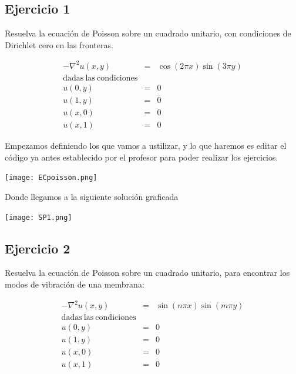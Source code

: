 \documentclass[12pt]{article}
\begin{document}


\subsection*{Ejercicio 1}

Resuelva la ecuación de Poisson sobre un cuadrado unitario, con condiciones de Dirichlet cero en las fronteras. 

\begin{eqnarray*}
- \nabla^2 u(x,y) & = & \cos(2\pi x) \sin(3\pi y) \\
 \mathrm{dadas \ las \ condiciones}& &  \\ 
u(0,y) & = & 0 \\
u(1,y) & = & 0 \\
u(x,0) & = & 0 \\
u(x,1) & = & 0
\end{eqnarray*}

Empezamos definiendo los que vamos a ustilizar, y lo que haremos es editar el código ya antes establecido por el profesor para poder realizar los ejercicios.

\begin{center}
    \texttt{[image: ECpoisson.png]}
    
    Donde llegamos a la siguiente solución graficada
    
    \texttt{[image: SP1.png]}
    
\end{center}


\subsection*{Ejercicio 2}

Resuelva la ecuación de Poisson sobre un cuadrado unitario, para encontrar los modos de vibración de una membrana: 

\begin{eqnarray*}
- \nabla^2 u(x,y) & = & \sin(n\pi x) \sin(m\pi y) \\
 \mathrm{dadas \ las \ condiciones}& &  \\ 
u(0,y) & = & 0 \\
u(1,y) & = & 0 \\
u(x,0) & = & 0 \\
u(x,1) & = & 0
\end{eqnarray*}
\end{document}
